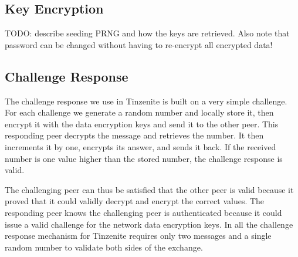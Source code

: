 \subsection{Key Encryption}
\label{sub:Key Encryption}

TODO: describe seeding PRNG and how the keys are retrieved.
Also note that password can be changed without having to re-encrypt all encrypted data!

\subsection{Challenge Response}
\label{sub:Challenge Response}

The challenge response we use in Tinzenite is built on a very simple challenge.
For each challenge we generate a random number and locally store it, then encrypt it with the data encryption keys and send it to the other peer.
This responding peer decrypts the message and retrieves the number.
It then increments it by one, encrypts its answer, and sends it back.
If the received number is one value higher than the stored number, the challenge response is valid.

The challenging peer can thus be satisfied that the other peer is valid because it proved that it could validly decrypt and encrypt the correct values.
The responding peer knows the challenging peer is authenticated because it could issue a valid challenge for the network data encryption keys.
In all the challenge response mechanism for Tinzenite requires only two messages and a single random number to validate both sides of the exchange.
